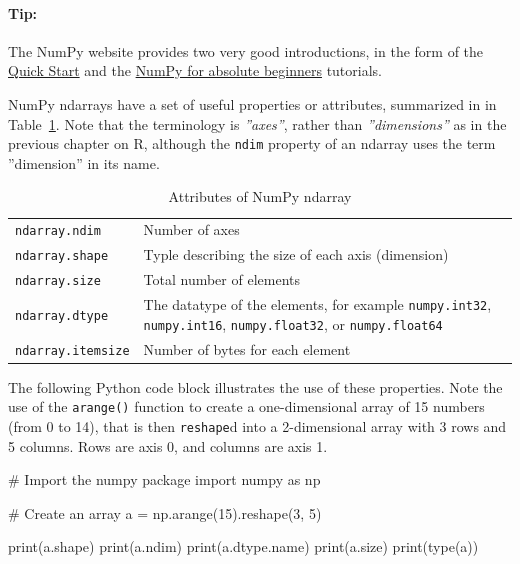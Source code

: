 \begin{tcolorbox}[colback=code]
\paragraph*{Tip:} The NumPy website provides two very good introductions, in the form of the \href{https://numpy.org/doc/stable/user/quickstart.html}{Quick Start} and the \href{
https://numpy.org/doc/stable/user/absolute_beginners.html}{NumPy for absolute beginners} tutorials.
\end{tcolorbox}

NumPy ndarrays have a set of useful properties or attributes, summarized in in Table~\ref{tab:numpydatatypes}. Note that the terminology is \emph{''axes''}, rather than \emph{''dimensions''} as in the previous chapter on R, although the \texttt{ndim} property of an ndarray uses the term ''dimension'' in its name.

\begin{table}
\centering
\renewcommand{\arraystretch}{1.25}
\begin{tabularx}{\linewidth}{l|X} \hline
\texttt{ndarray.ndim} & Number of axes \\
\texttt{ndarray.shape} & Typle describing the size of each axis (dimension) \\
\texttt{ndarray.size} & Total number of elements \\
\texttt{ndarray.dtype} & The datatype of the elements, for example \texttt{numpy.int32}, \texttt{numpy.int16}, \texttt{numpy.float32}, or \texttt{numpy.float64} \\
\texttt{ndarray.itemsize} & Number of bytes for each element \\ \hline
\end{tabularx}
\caption{Attributes of NumPy ndarray}
\label{tab:numpydatatypes}
\end{table}

The following Python code block illustrates the use of these properties. Note the use of the \texttt{arange()} function to create a one-dimensional array of 15 numbers (from 0 to 14), that is then \texttt{reshape}d into a 2-dimensional array with 3 rows and 5 columns. Rows are axis 0, and columns are axis 1.

\begin{samepage}
\begin{pythoncode}
# Import the numpy package
import numpy as np

# Create an array
a = np.arange(15).reshape(3, 5)

print(a.shape)
print(a.ndim)
print(a.dtype.name)
print(a.size)
print(type(a))
\end{pythoncode}
\end{samepage}

